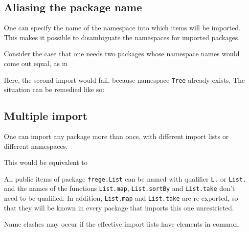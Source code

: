 \subsection{Aliasing the package name}
One can specify the name of the namespace into which
items will be imported. This makes it possible to disambiguate the
namespaces for imported packages.

Consider the case that one needs two packages whose namespace names would come out equal, as in


Here, the second import would fail, because namespace \texttt{Tree} already
exists. The situation can be remedied like so:


\subsection{Multiple import}
One can import any package more than once, with different import
lists or different namespaces. 


This would be equivalent to 


All public items of package \texttt{frege.List} can be named with qualifier \texttt{L.} or \texttt{List.} 
and the names of the functions \texttt{List.map},  \texttt{List.sortBy} and  \texttt{List.take} don't need to be qualified. 
In addition, \texttt{List.map} and \texttt{List.take} are re-exported, so that they will be known in every package that imports this one unrestricted.

Name clashes may occur if the effective import lists have elements in common. 

